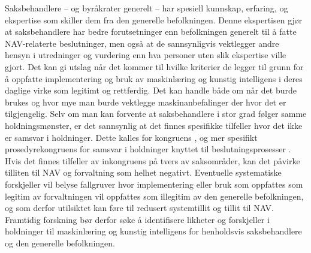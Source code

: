 \documentclass[
]{book}
\begin{document}
Saksbehandlere -- og byråkrater generelt -- har spesiell kunnskap, erfaring, og ekspertise som skiller dem fra den generelle befolkningen.
Denne ekspertisen gjør at saksbehandlere har bedre forutsetninger enn befolkningen generelt til å fatte NAV-relaterte beslutninger, men også at de sannsynligvis vektlegger andre hensyn i utredninger og vurdering enn hva personer uten slik ekspertise ville gjort.
Det kan gi utslag når det kommer til hvilke kriterier de legger til grunn for å oppfatte implementering og bruk av maskinlæring og kunstig intelligens i deres daglige virke som legitimt og rettferdig.
Det kan handle både om når det burde brukes og hvor mye man burde vektlegge maskinanbefalinger der hvor det er tilgjengelig.
Selv om man kan forvente at saksbehandlere i stor grad følger samme holdningsmønster, er det sannsynlig at det finnes spesifikke tilfeller hvor det ikke er samsvar i holdninger.
Dette kalles for kongruens \citep{golder2010ideological}, og mer spesifikt prosedyrekongruens for samsvar i holdninger knyttet til beslutningsprosesser \citep{BroderstadTroySaghaug2022DR:T}.
Hvis det finnes tilfeller av inkongruens på tvers av saksområder, kan det påvirke tilliten til NAV og forvaltning som helhet negativt.
Eventuelle systematiske forskjeller vil belyse fallgruver hvor implementering eller bruk som oppfattes som legitim av forvaltningen vil oppfattes som illegitim av den generelle befolkningen, og som derfor utilsiktet kan føre til redusert systemtillit og tillit til NAV.
Framtidig forskning bør derfor søke å identifisere likheter og forskjeller i holdninger til maskinlæring og kunstig intelligens for henholdsvis saksbehandlere og den generelle befolkningen.

  
\end{document}
